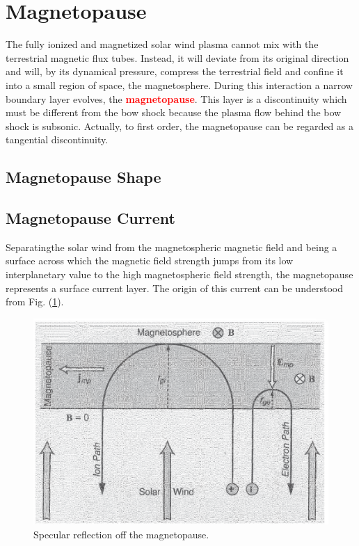 \documentclass[12pt,a4paper]{article}
\begin{document}
\section{Magnetopause}
\cite{1996bspp.book.....B} The fully ionized and magnetized solar wind plasma cannot mix with the terrestrial magnetic flux tubes. Instead, it will deviate from its original direction and will, by its dynamical pressure, compress the terrestrial field and confine it into a small region of space, the magnetosphere. During this interaction a narrow boundary layer evolves, the \textcolor{red}{\bf magnetopause}. This layer is a discontinuity which must be different from the bow shock because the plasma flow behind the bow shock is subsonic. Actually, to first order, the magnetopause can be regarded as a tangential discontinuity. 

\subsection{Magnetopause Shape}
\cite{1996bspp.book.....B} 


\subsection{Magnetopause Current}
\cite{1996bspp.book.....B} Separatingthe solar wind from the magnetospheric magnetic field and being a surface across which the magnetic field strength jumps from its low interplanetary value to the high magnetospheric field strength, the magnetopause represents a surface current layer. The origin of this current can be understood from Fig. (\ref{fig:Magnetopause_Current}).

\begin{figure}
\centering
\includegraphics[height=10.cm,angle=0]{Magnetopause_Current.eps}
\caption{
Specular reflection off the magnetopause.
} 
\label{fig:Magnetopause_Current}
\end{figure}
\end{document}
